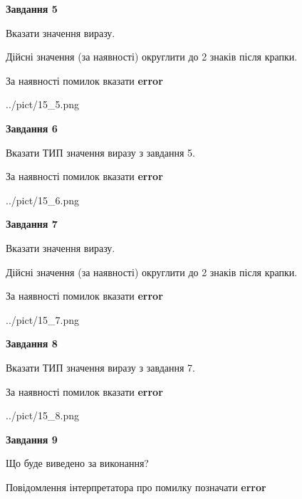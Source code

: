 \documentclass[11pt, ukrainian]{article}
\begin{document}
{\begin {large}
{\begin {center}\textbf{Завдання 5}\end {center}}\par
Вказати значення виразу. \par
Дійсні значення (за наявності) округлити до 2 знаків після крапки. \par
За наявності помилок вказати \textbf{error}

\begin{center}
	{../pict/15_5.png}
\end{center}
\newpage

{\begin {center}\textbf{Завдання 6}\end {center}}\par
Вказати ТИП значення виразу з завдання 5. \par
За наявності помилок вказати \textbf{error}

\begin{center}
	{../pict/15_6.png}
\end{center}
\newpage

{\begin {center}\textbf{Завдання 7}\end {center}}\par
Вказати значення виразу. \par
Дійсні значення (за наявності) округлити до 2 знаків після крапки. \par
За наявності помилок вказати \textbf{error}

\begin{center}
	{../pict/15_7.png}
\end{center}
\newpage

{\begin {center}\textbf{Завдання 8}\end {center}}\par
Вказати ТИП значення виразу з завдання 7. \par
За наявності помилок вказати \textbf{error}

\begin{center}
	{../pict/15_8.png}
\end{center}
\newpage

{\begin {center}\textbf{Завдання 9}\end {center}}\par
Що буде виведено за виконання? \par
Повідомлення інтерпретатора про помилку позначати \textbf{error}


\end{large}}
\end{document}
